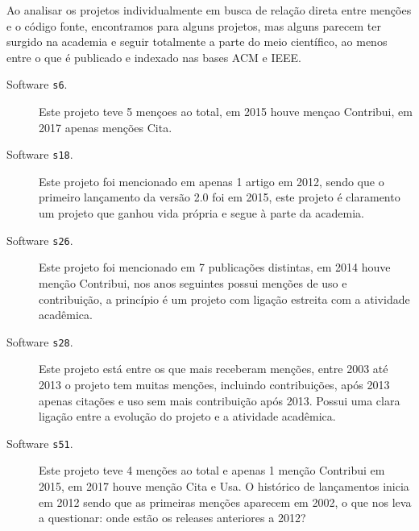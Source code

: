 Ao analisar os projetos individualmente em busca de relação direta entre
menções e o código fonte, encontramos para alguns projetos, mas alguns parecem
ter surgido na academia e seguir totalmente a parte do meio científico, ao
menos entre o que é publicado e indexado nas bases ACM e IEEE.

\begin{description}

  \item[Software \texttt{s6}.]
    Este projeto teve 5 mençoes ao total, em 2015 houve mençao Contribui, em
    2017 apenas menções Cita.

  \item[Software \texttt{s18}.]
    Este projeto foi mencionado em apenas 1 artigo em 2012, sendo que o
    primeiro lançamento da versão 2.0 foi em 2015, este projeto é claramento um
    projeto que ganhou vida própria e segue à parte da academia.

  \item[Software \texttt{s26}.]
    Este projeto foi mencionado em 7 publicações distintas, em 2014 houve
    menção Contribui, nos anos seguintes possui menções de uso e contribuição,
    a princípio é um projeto com ligação estreita com a atividade acadêmica.

  \item[Software \texttt{s28}.]
    Este projeto está entre os que mais receberam menções, entre 2003 até 2013
    o projeto tem muitas menções, incluindo contribuições, após 2013 apenas
    citações e uso sem mais contribuição após 2013. Possui uma clara ligação
    entre a evolução do projeto e a atividade acadêmica.


  \item[Software \texttt{s51}.]
    Este projeto teve 4 menções ao total e apenas 1 menção Contribui em 2015,
    em 2017 houve menção Cita e Usa. O histórico de lançamentos inicia em 2012
    sendo que as primeiras menções aparecem em 2002, o que nos leva a
    questionar: onde estão os releases anteriores a 2012?


\end{description}
